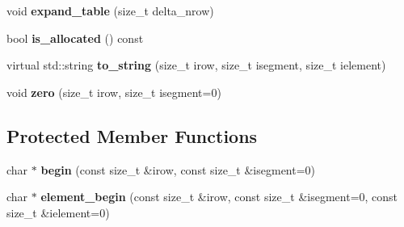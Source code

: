 \begin{DoxyCompactItemize}
\item 
void {\bfseries expand\+\_\+table} (size\+\_\+t delta\+\_\+nrow)\hypertarget{classField_a8f260d0da4c9c1cb9d3b34dac14379b5}{}\label{classField_a8f260d0da4c9c1cb9d3b34dac14379b5}

\item 
bool {\bfseries is\+\_\+allocated} () const \hypertarget{classField_a9b6c13c9577ce803d03ea56d0b220170}{}\label{classField_a9b6c13c9577ce803d03ea56d0b220170}

\item 
virtual std\+::string {\bfseries to\+\_\+string} (size\+\_\+t irow, size\+\_\+t isegment, size\+\_\+t ielement)\hypertarget{classField_a7027f7704b3dd815171ec0673b015680}{}\label{classField_a7027f7704b3dd815171ec0673b015680}

\item 
void {\bfseries zero} (size\+\_\+t irow, size\+\_\+t isegment=0)\hypertarget{classField_a8f7e5b0d893a09a654c890d5e2723bb3}{}\label{classField_a8f7e5b0d893a09a654c890d5e2723bb3}

\end{DoxyCompactItemize}
\subsection*{Protected Member Functions}
\begin{DoxyCompactItemize}
\item 
char $\ast$ {\bfseries begin} (const size\+\_\+t \&irow, const size\+\_\+t \&isegment=0)\hypertarget{classField_a8402c4cc84e7c2559bb200c0a770a999}{}\label{classField_a8402c4cc84e7c2559bb200c0a770a999}

\item 
char $\ast$ {\bfseries element\+\_\+begin} (const size\+\_\+t \&irow, const size\+\_\+t \&isegment=0, const size\+\_\+t \&ielement=0)\hypertarget{classField_ac744b63e719e32c642d7628e0135f91d}{}\label{classField_ac744b63e719e32c642d7628e0135f91d}

\end{DoxyCompactItemize}
